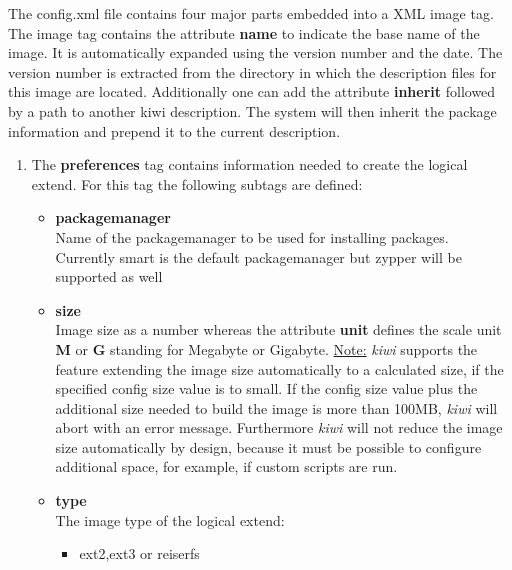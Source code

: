 \begin{itemize}
      The config.xml file contains four major parts embedded into a
      XML image tag. The image tag contains the attribute \textbf{name}
      to indicate the base name of the image. It is automatically expanded
      using the version number and the date. The version number is
      extracted from the directory in which the description files for
      this image are located. Additionally one can add the attribute
      \textbf{inherit} followed by a path to another kiwi description.
      The system will then inherit the package information and prepend
      it to the current description.

      \begin{enumerate}
          \item The \textbf{preferences} tag contains information needed to
          create the logical extend. For this tag the following subtags
          are defined:
          \begin{itemize}
              \item \textbf{packagemanager}\\
                    Name of the packagemanager to be used for installing
                    packages. Currently smart is the default packagemanager
                    but zypper will be supported as well
              \item \textbf{size}\\
                    Image size as a number whereas the attribute
                    \textbf{unit} defines the scale unit \textbf{M} or
                    \textbf{G} standing for Megabyte or Gigabyte.
                    \underline{Note:}
                    \textit{kiwi} supports the feature extending the image size
                    automatically to a calculated size, if the specified
                    config size value is to small. If the config size value
                    plus the additional size needed to build the image is more
                    than 100MB, \textit{kiwi} will abort with an error message.
                    Furthermore \textit{kiwi} will not reduce the image size
                    automatically by design, because it must be possible to
                    configure additional space, for example, if custom scripts
                    are run.
              \item \textbf{type}\\
                    The image type of the logical extend:
					\begin{itemize}
						\item ext2,ext3 or reiserfs\\

\end{itemize}
\end{itemize}
\end{enumerate}
\end{itemize}
